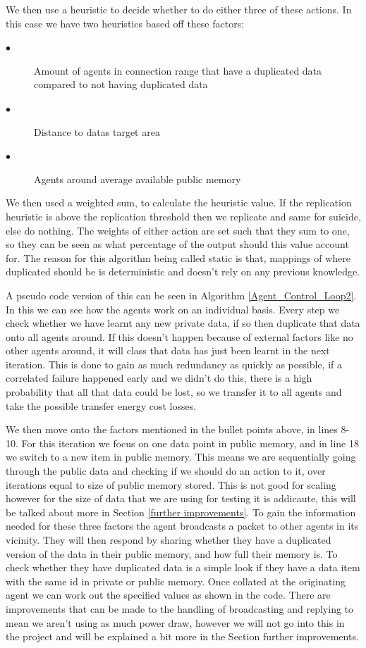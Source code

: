 \documentclass{UoYCSproject}
\begin{document}
We then use a heuristic to decide whether to do either three of these actions. 
In this case we have two heuristics based off these factors:

\begin{description}
\item[$\bullet$] Amount of agents in connection range that have a duplicated data compared to not having duplicated data
\item[$\bullet$] Distance to datas target area
\item[$\bullet$] Agents around average available public memory
\end{description}

We then used a weighted sum, to calculate the heuristic value. 
If the replication heuristic is above the replication threshold then we replicate and same for suicide, else do nothing. 
The weights of either action are set such that they sum to one, so they can be seen as what percentage of the output should this value account for. 
The reason for this algorithm being called static is that, mappings of where duplicated should be is deterministic and doesn’t rely on any previous knowledge. 

A pseudo code version of this can be seen in Algorithm \ref{Agent_Control_Loop2}. 
In this we can see how the agents work on an individual basis. 
Every step we check whether we have learnt any new private data, if so then duplicate that data onto all agents around. 
If this doesn’t happen because of external factors like no other agents around, it will class that data has just been learnt in the next iteration. 
This is done to gain as much redundancy as quickly as possible, if a correlated failure happened early and we didn’t do this, there is a high probability that all that data could be lost, so we transfer it to all agents and take the possible transfer energy cost losses.

We then move onto the factors mentioned in the bullet points above, in lines 8-10. 
For this iteration we focus on one data point in public memory, and in line 18 we switch to a new item in public memory. 
This means we are sequentially going through the public data and checking if we should do an action to it, over iterations equal to size of public memory stored. 
This is not good for scaling however for the size of data that we are using for testing it is addicaute, this will be talked about more in Section \ref{further improvements}. 
To gain the information needed for these three factors the agent broadcasts a packet to other agents in its vicinity. 
They will then respond by sharing whether they have a duplicated version of the data in their public memory, and how full their memory is. 
To check whether they have duplicated data is a simple look if they have a data item with the same id in private or public memory. 
Once collated at the originating agent we can work out the specified values as shown in the code. 
There are improvements that can be made to the handling of broadcasting and replying to mean we aren’t using as much power draw, however we will not go into this in the project and will be explained a bit more in the Section {further improvements}.
\end{document}

